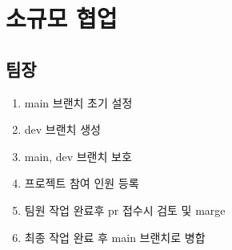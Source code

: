 \documentclass[12pt,a4paper]{oblivoir}
\begin{document}
\section[소규모 협업]{소규모 협업}
\subsection{팀장}
\begin{enumerate}
\item main 브랜치 초기 설정
\item dev 브랜치 생성
\item main, dev 브랜치 보호
\item 프로젝트 참여 인원 등록
\item 팀원 작업 완료후 pr 접수시 검토 및 marge
\item 최종 작업 완료 후 main 브랜치로 병합
\end{enumerate}
\end{document}
